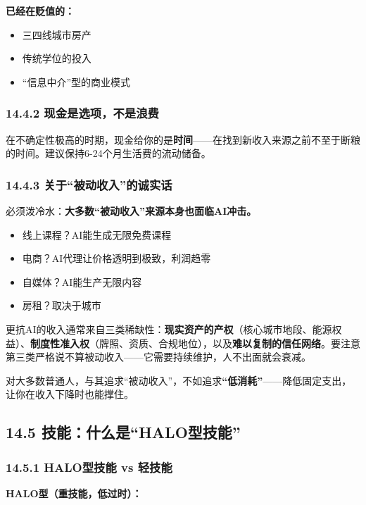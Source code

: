 \documentclass[11pt,a4paper]{ctexart}
\begin{document}
\textbf{已经在贬值的：}

\begin{itemize}
  \item 三四线城市房产
  \item 传统学位的投入
  \item “信息中介”型的商业模式
\end{itemize}

\subsubsection{14.4.2 现金是选项，不是浪费}

在不确定性极高的时期，现金给你的是\textbf{时间}——在找到新收入来源之前不至于断粮的时间。建议保持6-24个月生活费的流动储备。

\subsubsection{14.4.3 关于“被动收入”的诚实话}

必须泼冷水：\textbf{大多数“被动收入”来源本身也面临AI冲击。}

\begin{itemize}
  \item 线上课程？AI能生成无限免费课程
  \item 电商？AI代理让价格透明到极致，利润趋零
  \item 自媒体？AI能生产无限内容
  \item 房租？取决于城市
\end{itemize}

更抗AI的收入通常来自三类稀缺性：\textbf{现实资产的产权}（核心城市地段、能源权益）、\textbf{制度性准入权}（牌照、资质、合规地位），以及\textbf{难以复制的信任网络}。要注意第三类严格说不算被动收入——它需要持续维护，人不出面就会衰减。

对大多数普通人，与其追求“被动收入”，不如追求\textbf{“低消耗”}——降低固定支出，让你在收入下降时也能撑住。

\subsection{14.5 技能：什么是“HALO型技能”}

\subsubsection{14.5.1 HALO型技能 vs 轻技能}

\textbf{HALO型（重技能，低过时）：}
\end{document}
